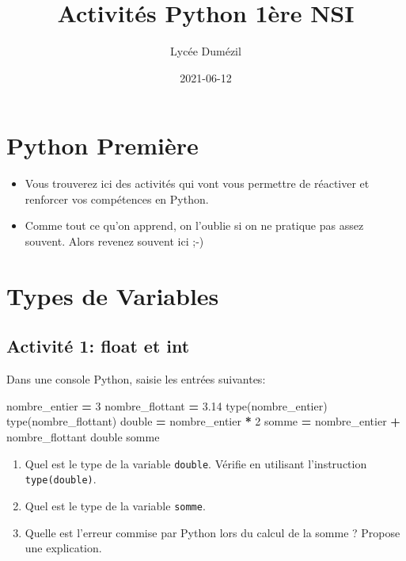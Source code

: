 \documentclass[
]{book}
\title{Activités Python 1ère NSI}
\author{Lycée Dumézil}
\date{2021-06-12}
\newenvironment{Shaded}{\begin{snugshade}}{\end{snugshade}}
\newcommand{\BuiltInTok}[1]{#1}
\newcommand{\DecValTok}[1]{\textcolor[rgb]{0.00,0.00,0.81}{#1}}
\newcommand{\FloatTok}[1]{\textcolor[rgb]{0.00,0.00,0.81}{#1}}
\newcommand{\NormalTok}[1]{#1}
\newcommand{\OperatorTok}[1]{\textcolor[rgb]{0.81,0.36,0.00}{\textbf{#1}}}
\providecommand{\tightlist}{%
  \setlength{\itemsep}{0pt}\setlength{\parskip}{0pt}}
\def\tightlist{}
\begin{document}
\maketitle

{
\setcounter{tocdepth}{1}
\tableofcontents
}
\hypertarget{python-premiuxe8re}{%
\chapter*{Python Première}\label{python-premiuxe8re}}

\begin{itemize}
\tightlist
\item
  Vous trouverez ici des activités qui vont vous permettre de réactiver et renforcer vos compétences en Python.
\item
  Comme tout ce qu'on apprend, on l'oublie si on ne pratique pas assez souvent. Alors revenez souvent ici ;-)
\end{itemize}

\hypertarget{types-de-variables}{%
\chapter{Types de Variables}\label{types-de-variables}}

\hypertarget{activituxe9-1-float-et-int}{%
\section{Activité 1: float et int}\label{activituxe9-1-float-et-int}}

Dans une console Python, saisie les entrées suivantes:

\begin{Shaded}
\begin{Highlighting}[]
\NormalTok{nombre\_entier }\OperatorTok{=} \DecValTok{3} 
\NormalTok{nombre\_flottant }\OperatorTok{=} \FloatTok{3.14}
\BuiltInTok{type}\NormalTok{(nombre\_entier)}
\BuiltInTok{type}\NormalTok{(nombre\_flottant)}
\NormalTok{double }\OperatorTok{=}\NormalTok{ nombre\_entier }\OperatorTok{*} \DecValTok{2}
\NormalTok{somme }\OperatorTok{=}\NormalTok{ nombre\_entier }\OperatorTok{+}\NormalTok{ nombre\_flottant}
\NormalTok{double}
\NormalTok{somme}
\end{Highlighting}
\end{Shaded}

\begin{enumerate}
\def\labelenumi{\arabic{enumi}.}
\tightlist
\item
  Quel est le type de la variable \texttt{double}. Vérifie en utilisant l'instruction \texttt{type(double)}.
\item
  Quel est le type de la variable \texttt{somme}.
\item
  Quelle est l'erreur commise par Python lors du calcul de la somme ? Propose une explication.
\end{enumerate}
\end{document}
